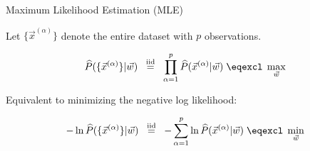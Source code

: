 \begin{frame}{Maximum Likelihood Estimation (MLE)}

Let $\{ \vec x^{(\alpha)}\}$ denote the entire dataset with $p$ observations.

    \begin{equation}
		\widehat P(\{ \vec x^{(\alpha)} \} | \vec w) \;\; \stackrel{\text{iid}}{=} \;\; \prod_{\alpha=1}^p \widehat P(\vec x^{(\alpha)} | \vec w) \; \eqexcl \; \max_{\vec w}
    \end{equation}
    
Equivalent to minimizing the negative log likelihood:

    \begin{equation}
    - \ln \widehat P(\{ \vec x^{(\alpha)} \} | \vec w) \;\; \stackrel{\text{iid}}{=} \;\; 
		- \sum_{\alpha=1}^p \ln \widehat P(\vec x^{(\alpha)} | \vec w) \; \eqexcl \; \min_{\vec w}
    \end{equation}

	
\end{frame}

